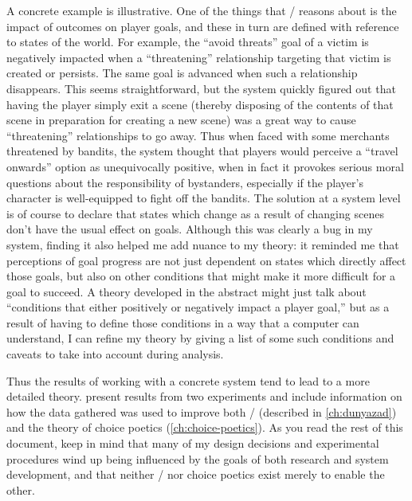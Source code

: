 A concrete example is illustrative.
%
One of the things that \dunyazad/ reasons about is the impact of outcomes on player goals, and these in turn are defined with reference to states of the world.
%
For example, the ``avoid threats'' goal of a victim is negatively impacted when a ``threatening'' relationship targeting that victim is created or persists.
%
The same goal is advanced when such a relationship disappears.
%
This seems straightforward, but the system quickly figured out that having the player simply exit a scene (thereby disposing of the contents of that scene in preparation for creating a new scene) was a great way to cause ``threatening'' relationships to go away.
%
Thus when faced with some merchants threatened by bandits, the system thought that players would perceive a ``travel onwards'' option as unequivocally positive, when in fact it provokes serious moral questions about the responsibility of bystanders, especially if the player's character is well-equipped to fight off the bandits.
%
The solution at a system level is of course to declare that states which change as a result of changing scenes don't have the usual effect on goals.
%
Although this was clearly a bug in my system, finding it also helped me add nuance to my theory: it reminded me that perceptions of goal progress are not just dependent on states which directly affect those goals, but also on other conditions that might make it more difficult for a goal to succeed.
%
A theory developed in the abstract might just talk about ``conditions that either positively or negatively impact a player goal,'' but as a result of having to define those conditions in a way that a computer can understand, I can refine my theory by giving a list of some such conditions and caveats to take into account during analysis.


Thus the results of working with a concrete system tend to lead to a more detailed theory.
%
 present results from two experiments and include information on how the data gathered was used to improve both \dunyazad/ (described in \cref{ch:dunyazad}) and the theory of choice poetics (\cref{ch:choice-poetics}).
%
As you read the rest of this document, keep in mind that many of my design decisions and experimental procedures wind up being influenced by the goals of both research and system development, and that neither \dunyazad/ nor choice poetics exist merely to enable the other.
